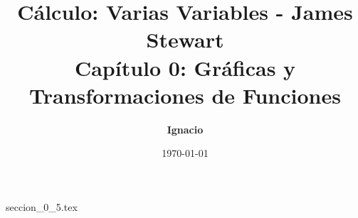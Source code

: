 \documentclass[11pt,spanish,oneside]{report}
\title{\textbf{Cálculo: Varias Variables - James Stewart} \\ \Large Capítulo 0: Gráficas y Transformaciones de Funciones}
\author{\textbf{Ignacio}}
\date{\today}
\begin{document}
\maketitle

{seccion_0_5.tex}
\end{document}
